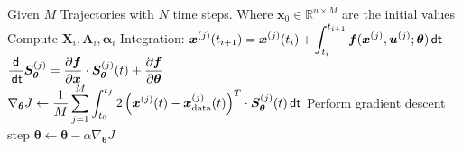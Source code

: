 \documentclass[a4paper, 12pt]{scrartcl}
\newcommand{\dt}{\thinspace \mathsf{dt}}
\begin{document}
\begin{algorithm}\label{alg:MLP_Sensitivity}
    \caption{Training of a MLP Neural ODE with Sensitivity Approach}
    \begin{algorithmic}[1]
        \State Given $M$ Trajectories with $N$ time steps. 
        Where $\bm{x}_0 \in \mathbb{R}^{n \times M}$ are the initial values 
                \State Compute $\bm{X}_i, \bm{A}_i, \bm{\alpha}_i$
                \State Integration:
                $\begin{aligned}
                    \bm{x}^{(j)}(t_{i+1})
                    = 
                    \bm{x}^{(j)}(t_{i})
                    +
                    \int_{t_i}^{t_{i+1}}
                    \bm{f}(\bm{x}^{(j)}, \bm{u}^{(j)}; \bm{\theta}) \dt
                \end{aligned}$
            \EndFor
                \State %
                $\begin{aligned}
                    \frac{\mathsf{d}}{\dt} \bm{S}_{\bm{\theta}}^{(j)}
                    = 
                    \frac{\partial \bm{f}}{\partial \bm{x}}
                    \cdot 
                    \bm{S}_{\bm{\theta}}^{(j)}(t)
                    +
                    \frac{\partial \bm{f}}{\partial \bm{\theta}}
                \end{aligned}$
            \EndFor
            \State 
            $\begin{aligned}
                \nabla_{\bm{\theta}} J 
                \leftarrow
                \frac{1}{M} 
                \sum_{j=1}^{M}
                \int_{t_0}^{t_f}
                2 \left(\bm{x}^{(j)}(t) - \bm{x}_{\text{data}}^{(j)}(t)\right)^T 
                \cdot 
                \bm{S}_{\bm{\theta}}^{(j)}(t) \dt
            \end{aligned}$
            \State Perform gradient descent step 
            $\bm{\theta} \leftarrow \bm{\theta} - \alpha \nabla_{\bm{\theta}} J$ 
        \EndFor
    \end{algorithmic}
\end{algorithm}
\end{document}
